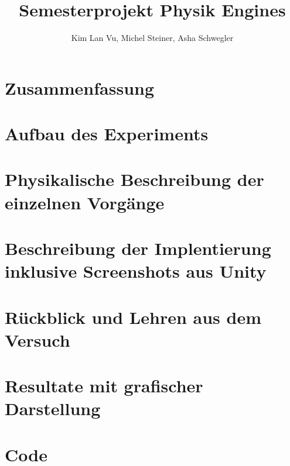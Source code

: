 \documentclass{article}[11pt,paper=A4, margin=1cm]
\title{Semesterprojekt Physik Engines}
\author{Kim Lan Vu, Michel Steiner, Asha Schwegler}
\begin{document}
\maketitle
\newpage

\tableofcontents



\newpage
\newpage
\section {Zusammenfassung}

\newpage
\section {Aufbau des Experiments}

\newpage
\section {Physikalische Beschreibung der einzelnen Vorgänge}

\newpage
\section {Beschreibung der Implentierung inklusive Screenshots aus Unity}

\newpage
\section {Rückblick und Lehren aus dem Versuch}

\newpage
\section {Resultate mit grafischer Darstellung}

\newpage
\section {Code}


\appendix
%

\newpage
\listoffigures

\newpage

\printbibliography
\end{document}
